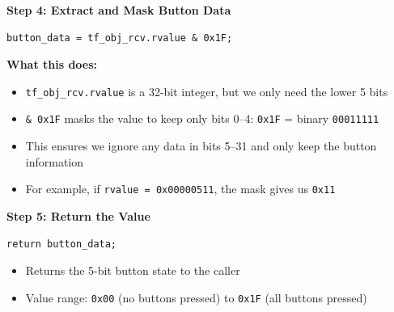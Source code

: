 \textbf{Step 4: Extract and Mask Button Data}
\begin{verbatim}
button_data = tf_obj_rcv.rvalue & 0x1F;
\end{verbatim}
\textbf{What this does:}
\begin{itemize}
    \item \texttt{tf\_obj\_rcv.rvalue} is a 32-bit integer, but we only need the lower 5 bits
    \item \texttt{\& 0x1F} masks the value to keep only bits 0--4: \texttt{0x1F} = binary \texttt{00011111}
    \item This ensures we ignore any data in bits 5--31 and only keep the button information
    \item For example, if \texttt{rvalue = 0x00000511}, the mask gives us \texttt{0x11}
\end{itemize}

\textbf{Step 5: Return the Value}
\begin{verbatim}
return button_data;    
\end{verbatim}

\begin{itemize}
    \item Returns the 5-bit button state to the caller
    \item Value range: \texttt{0x00} (no buttons pressed) to \texttt{0x1F} (all buttons pressed)
\end{itemize}

